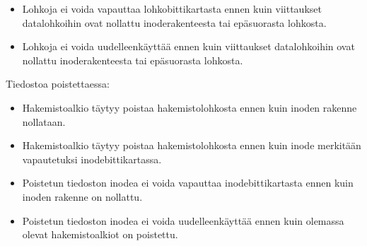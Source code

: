 \begin{itemize}
    \item{Lohkoja ei voida vapauttaa lohkobittikartasta ennen kuin viittaukset datalohkoihin ovat nollattu inoderakenteesta tai epäsuorasta lohkosta.}
    \item{Lohkoja ei voida uudelleenkäyttää ennen kuin viittaukset datalohkoihin ovat nollattu inoderakenteesta tai epäsuorasta lohkosta.}
\end{itemize}
Tiedostoa poistettaessa:
\begin{itemize}
    \item{Hakemistoalkio täytyy poistaa hakemistolohkosta ennen kuin inoden rakenne nollataan.}
    \item{Hakemistoalkio täytyy poistaa hakemistolohkosta ennen kuin inode merkitään vapautetuksi inodebittikartassa.}
    \item{Poistetun tiedoston inodea ei voida vapauttaa inodebittikartasta ennen kuin inoden rakenne on nollattu.}
    \item{Poistetun tiedoston inodea ei voida uudelleenkäyttää ennen kuin olemassa olevat hakemistoalkiot on poistettu.}
\end{itemize}


